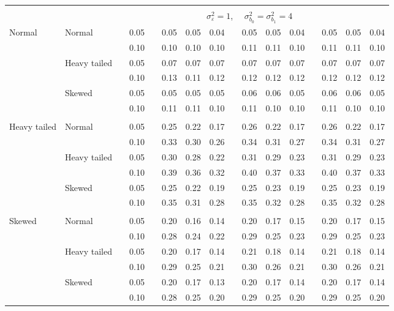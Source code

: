 \documentclass[12pt]{article} %
\begin{document}
\begin{table}[ht]
\begin{scriptsize}
\begin{center}
\begin{tabular}{ll p{.1cm} c p{.1cm} rrr p{.1cm} rrr p{.1cm} rrr}
&&&&&&&&&&&&&&&\\
& && && \multicolumn{9}{c}{$\sigma_{\varepsilon}^2 = 1$, \ \ $\sigma_{b_0}^2 = \sigma_{b_1}^2 = 4$} \\ \cline{6-16}
\rowcolor{gray!20}Normal       & Normal       && 0.05 &&   0.05 & 0.05 & 0.04 && 0.05 & 0.05 & 0.04 && 0.05 & 0.05 & 0.04 \\ 
\rowcolor{gray!20}             &              && 0.10 &&   0.10 & 0.10 & 0.10 && 0.11 & 0.11 & 0.10 && 0.11 & 0.11 & 0.10 \\ 
\rowcolor{gray!20}             & Heavy tailed && 0.05 &&   0.07 & 0.07 & 0.07 && 0.07 & 0.07 & 0.07 && 0.07 & 0.07 & 0.07 \\ 
\rowcolor{gray!20}             &              && 0.10 &&   0.13 & 0.11 & 0.12 && 0.12 & 0.12 & 0.12 && 0.12 & 0.12 & 0.12 \\ 
\rowcolor{gray!20}             & Skewed       && 0.05 &&   0.05 & 0.05 & 0.05 && 0.06 & 0.06 & 0.05 && 0.06 & 0.06 & 0.05 \\ 
\rowcolor{gray!20}             &              && 0.10 &&   0.11 & 0.11 & 0.10 && 0.11 & 0.10 & 0.10 && 0.11 & 0.10 & 0.10 \\ 
             &&&&&&&&&&&&&&&\\
Heavy tailed & Normal       && 0.05 &&   0.25 & 0.22 & 0.17 && 0.26 & 0.22 & 0.17 && 0.26 & 0.22 & 0.17 \\ 
             &              && 0.10 &&   0.33 & 0.30 & 0.26 && 0.34 & 0.31 & 0.27 && 0.34 & 0.31 & 0.27 \\ 
             & Heavy tailed && 0.05 &&   0.30 & 0.28 & 0.22 && 0.31 & 0.29 & 0.23 && 0.31 & 0.29 & 0.23 \\ 
             &              && 0.10 &&   0.39 & 0.36 & 0.32 && 0.40 & 0.37 & 0.33 && 0.40 & 0.37 & 0.33 \\ 
             & Skewed       && 0.05 &&   0.25 & 0.22 & 0.19 && 0.25 & 0.23 & 0.19 && 0.25 & 0.23 & 0.19 \\ 
             &              && 0.10 &&   0.35 & 0.31 & 0.28 && 0.35 & 0.32 & 0.28 && 0.35 & 0.32 & 0.28 \\ 
             &&&&&&&&&&&&&&&\\
Skewed       & Normal       && 0.05 &&   0.20 & 0.16 & 0.14 && 0.20 & 0.17 & 0.15 && 0.20 & 0.17 & 0.15 \\ 
             &              && 0.10 &&   0.28 & 0.24 & 0.22 && 0.29 & 0.25 & 0.23 && 0.29 & 0.25 & 0.23 \\ 
             & Heavy tailed && 0.05 &&   0.20 & 0.17 & 0.14 && 0.21 & 0.18 & 0.14 && 0.21 & 0.18 & 0.14 \\ 
             &              && 0.10 &&   0.29 & 0.25 & 0.21 && 0.30 & 0.26 & 0.21 && 0.30 & 0.26 & 0.21 \\ 
             & Skewed       && 0.05 &&   0.20 & 0.17 & 0.13 && 0.20 & 0.17 & 0.14 && 0.20 & 0.17 & 0.14 \\ 
             &              && 0.10 &&   0.28 & 0.25 & 0.20 && 0.29 & 0.25 & 0.20 && 0.29 & 0.25 & 0.20 \\ 



\end{tabular}
\end{center}
\end{scriptsize}
\end{table}
\end{document}
